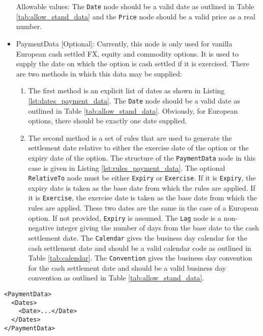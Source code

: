 \begin{itemize}
Allowable values: The \lstinline!Date! node should be a valid date as outlined in Table \ref{tab:allow_stand_data} and the \lstinline!Price! node should be a valid price as a real number.

\item PaymentData [Optional]: Currently, this node is only used for vanilla European cash settled FX, equity and commodity options. It is used to supply the date on which the option is cash settled if it is exercised. There are two methods in which this data may be supplied:

\begin{enumerate}
\item
The first method is an explicit list of dates as shown in Listing \ref{lst:dates_payment_data}. The \lstinline!Date! node should be a valid date as outlined in Table \ref{tab:allow_stand_data}. Obviously, for European options, there should be exactly one date supplied.

\item
The second method is a set of rules that are used to generate the settlement date relative to either the exercise date of the option or the expiry date of the option. The structure of the \lstinline!PaymentData! node in this case is given in Listing \ref{lst:rules_payment_data}. The optional \lstinline!RelativeTo! node must be either \lstinline!Expiry! or \lstinline!Exercise!. If it is \lstinline!Expiry!, the expiry date is taken as the base date from which the rules are applied. If it is \lstinline!Exercise!, the exercise date is taken as the base date from which the rules are applied. These two dates are the same in the case of a European option. If not provided, \lstinline!Expiry! is assumed. The \lstinline!Lag! node is a non-negative integer giving the number of days from the base date to the cash settlement date. The \lstinline!Calendar! gives the business day calendar for the cash settlement date and should be a valid calendar code as outlined in Table \ref{tab:calendar}. The \lstinline!Convention! gives the business day convention for the cash settlement date and should be a valid business day convention as outlined in Table \ref{tab:allow_stand_data}.

\end{enumerate}

\end{itemize}

\begin{listing}[H]
\begin{verbatim}
<PaymentData>
  <Dates>
    <Date>...</Date>
  </Dates>
</PaymentData>
\end{verbatim}
\caption{Dates based \lstinline!PaymentData!}
\label{lst:dates_payment_data}
\end{listing}

